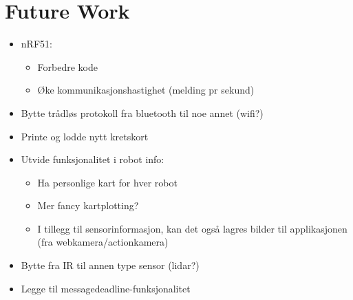 \chapter{Future Work}

\begin{itemize}
    \item nRF51:
    \begin{itemize}
        \item Forbedre kode
        \item Øke kommunikasjonshastighet (melding pr sekund)
    \end{itemize}
    \item Bytte trådløs protokoll fra bluetooth til noe annet (wifi?)
    \item Printe og lodde nytt kretskort
    \item Utvide funksjonalitet i robot info:
    \begin{itemize}
        \item Ha personlige kart for hver robot
        \item Mer fancy kartplotting?
        \item I tillegg til sensorinformasjon, kan det også lagres bilder til applikasjonen (fra webkamera/actionkamera)
    \end{itemize}
    \item Bytte fra IR til annen type sensor (lidar?)
    \item Legge til messagedeadline-funksjonalitet
\end{itemize}
